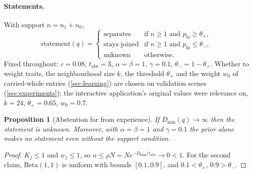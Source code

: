 \documentclass[10pt]{article}
\newtheorem{proposition}{Proposition}
\newcommand{\Beta}{\mathrm{Beta}}
\begin{document}
\paragraph{Statements.} With support $n=n_1+n_0$,
\begin{equation}
\text{statement}(q)=\begin{cases}\text{separates}&\text{if }n\ge1\text{ and }p_{\mathrm{lo}}\ge\theta_+,\\ \text{stays joined}&\text{if }n\ge1\text{ and }p_{\mathrm{hi}}\le\theta_-,\\ \text{unknown}&\text{otherwise.}\end{cases}
\end{equation}
Fixed throughout: $c=0.08$, $t_{\mathrm{abs}}=3$, $\alpha=\beta=1$, $\gamma=0.1$, $\theta_-=1-\theta_+$. Whether to weight traits, the neighbourhood size $k$, the threshold $\theta_+$ and the weight $w_0$ of carried-whole entries (\cref{sec:learning}) are chosen on validation scenes (\cref{sec:experiments}); the interactive application's original values were relevance on, $k=24$, $\theta_+=0.65$, $w_0=0.7$.

\begin{proposition}[Abstention far from experience]\label{prop:abstain}
If $D_{\min}(q)\to\infty$ then the statement is \emph{unknown}. Moreover, with $\alpha=\beta=1$ and $\gamma=0.1$ the prior alone makes no statement even without the support condition.
\end{proposition}
\begin{proof}
$K_j\le1$ and $w_j\le1$, so $n\le\rho N=N e^{-D_{\min}/t_{\mathrm{abs}}}\to0<1$. For the second claim, $\Beta(1,1)$ is uniform with bounds $[0.1,0.9]$, and $0.1<\theta_+$, $0.9>\theta_-$.
\end{proof}
\end{document}
